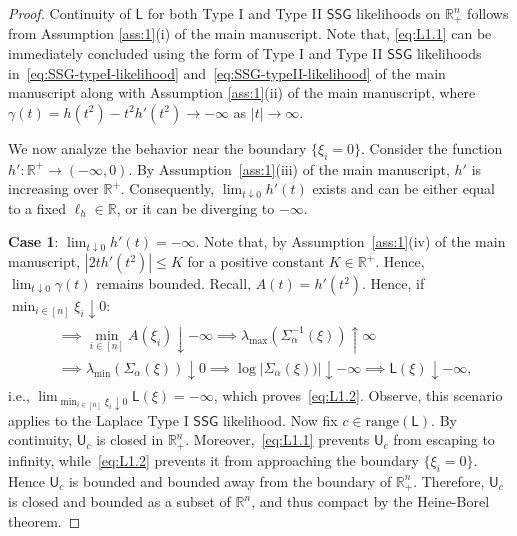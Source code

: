 \documentclass[12pt]{article}
\numberwithin{equation}{section}
\newcommand{\ssg}{\mathsf{SSG}}
\begin{document}
\begin{proof}
Continuity of $\mathsf{L}$ for both Type I and Type II $\mathsf{SSG}$ likelihoods on $\mathbb{R}_{+}^{n}$ follows from Assumption \ref{ass:1}(i) of the main manuscript. Note that, \eqref{eq:L1.1} can be immediately concluded  using the form of Type I and Type II $\mathsf{SSG}$ likelihoods in~\eqref{eq:SSG-typeI-likelihood} and~\eqref{eq:SSG-typeII-likelihood} of the main manuscript along with Assumption \ref{ass:1}(ii) of the main manuscript, where $\gamma(t) = h(t^2) - t^2 h'(t^2) \to -\infty$ as $|t| \to \infty$. 

We now analyze the behavior near the boundary $\{\xi_i=0\}$. Consider the function $h': \mathbb{R}^{+} \to (-\infty, 0)$. By Assumption~\ref{ass:1}(iii) of the main manuscript, $h'$ is increasing over $\mathbb{R}^{+}$. Consequently, $\lim_{t\downarrow 0}h'(t)$ exists and can be either equal to a fixed $\ell_h\in \mathbb{R}$, or it can be diverging to $-\infty$.

\textbf{Case 1}: $\lim_{t\downarrow 0}h'(t) = -\infty$. Note that, by Assumption~\ref{ass:1}(iv) of the main manuscript, $|2th'(t^2)| \leq K$ for a positive constant $K\in \mathbb{R}^{+}$. Hence, $\lim_{t\downarrow 0}\gamma(t)$ remains bounded. Recall, $A(t) = h'(t^2)$. Hence, if $\min_{i\in [n]}\xi_i \downarrow 0$:
%
\begin{align}
\begin{split}
&\implies \min_{i\in [n]}A(\xi_i) \downarrow -\infty 
\implies \lambda_{\max}(\Sigma^{-1}_{\alpha}(\xi)) \uparrow \infty\\
&
\implies \lambda_{\min}(\Sigma_{\alpha}(\xi)) \downarrow 0 
\implies \log |\Sigma_{\alpha}(\xi))| \downarrow -\infty
\implies \mathsf{L}(\xi) \downarrow -\infty,
\end{split}
\end{align}
i.e., $\lim_{\min_{i\in [n]}\xi_i\downarrow 0}\mathsf{L}(\xi) = -\infty$, which proves~\eqref{eq:L1.2}. Observe, this scenario applies to the Laplace Type I $\ssg$ likelihood. Now fix $c\in \mathrm{range}(\mathsf{L})$. By continuity, $\mathsf{U}_c$ is closed in $\mathbb{R}^{n}_+$. Moreover,~\eqref{eq:L1.1} prevents $\mathsf{U}_c$ from escaping to infinity, while~\eqref{eq:L1.2} prevents it from approaching the boundary $\{\xi_i=0\}$. Hence $\mathsf{U}_c$ is bounded and bounded away from the boundary of $\mathbb{R}^{n}_+$. Therefore, $\mathsf{U}_c$ is closed and bounded as a subset of $\mathbb{R}^{n}$, and thus compact by the Heine-Borel theorem.


\end{proof}
\end{document}
